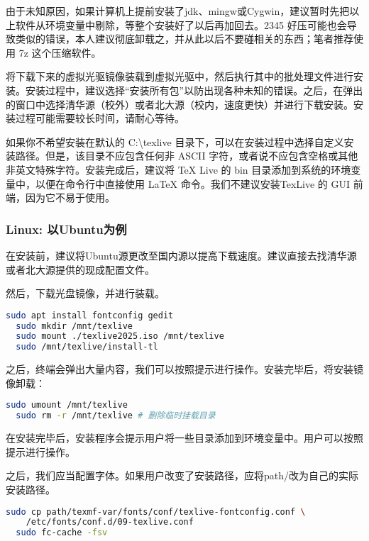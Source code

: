 \documentclass[../main.tex]{subfiles}
\begin{document}
由于未知原因，如果计算机上提前安装了jdk、mingw或Cygwin，建议暂时先把以上软件从环境变量中剔除，等整个安装好了以后再加回去。2345 好压可能也会导致类似的错误，本人建议彻底卸载之，并从此以后不要碰相关的东西；笔者推荐使用 7z 这个压缩软件。

将下载下来的虚拟光驱镜像装载到虚拟光驱中，然后执行其中的批处理文件进行安装。安装过程中，建议选择“安装所有包”以防出现各种未知的错误。之后，在弹出的窗口中选择清华源（校外）或者北大源（校内，速度更快）并进行下载安装。安装过程可能需要较长时间，请耐心等待。

如果你不希望安装在默认的 C:\textbackslash texlive 目录下，可以在安装过程中选择自定义安装路径。但是，该目录不应包含任何非 ASCII 字符，或者说不应包含空格或其他非英文特殊字符。安装完成后，建议将 TeX Live 的 bin 目录添加到系统的环境变量中，以便在命令行中直接使用 LaTeX 命令。我们不建议安装TexLive 的 GUI 前端，因为它不易于使用。

\subsubsection{Linux: 以Ubuntu为例}

在安装前，建议将Ubuntu源更改至国内源以提高下载速度。建议直接去找清华源或者北大源提供的现成配置文件。

然后，下载光盘镜像，并进行装载。

\begin{lstlisting}[language=bash]
  sudo apt install fontconfig gedit
  sudo mkdir /mnt/texlive
  sudo mount ./texlive2025.iso /mnt/texlive
  sudo /mnt/texlive/install-tl
\end{lstlisting}

之后，终端会弹出大量内容，我们可以按照提示进行操作。安装完毕后，将安装镜像卸载：

\begin{lstlisting}[language=bash]
  sudo umount /mnt/texlive
  sudo rm -r /mnt/texlive # 删除临时挂载目录
\end{lstlisting}

在安装完毕后，安装程序会提示用户将一些目录添加到环境变量中。用户可以按照提示进行操作。

之后，我们应当配置字体。如果用户改变了安装路径，应将path/改为自己的实际安装路径。

\begin{lstlisting}[language=bash]
  sudo cp path/texmf-var/fonts/conf/texlive-fontconfig.conf \
    /etc/fonts/conf.d/09-texlive.conf
  sudo fc-cache -fsv
\end{lstlisting}
\end{document}
